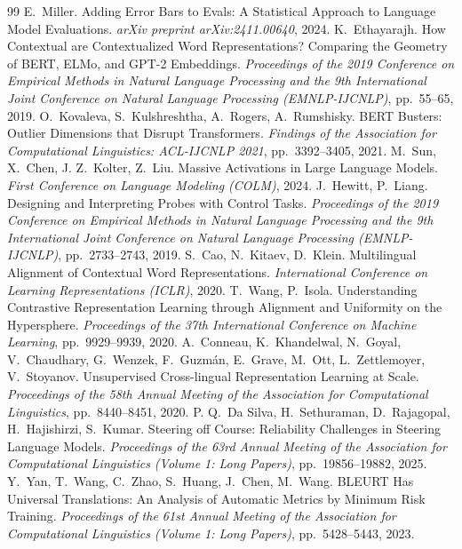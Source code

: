 \documentclass[11pt,a4paper]{article}
\begin{document}
\begin{thebibliography}{99}
E.~Miller. Adding Error Bars to Evals: A Statistical Approach to Language Model Evaluations. \emph{arXiv preprint arXiv:2411.00640}, 2024.
K.~Ethayarajh. How Contextual are Contextualized Word Representations? Comparing the Geometry of BERT, ELMo, and GPT-2 Embeddings. \emph{Proceedings of the 2019 Conference on Empirical Methods in Natural Language Processing and the 9th International Joint Conference on Natural Language Processing (EMNLP-IJCNLP)}, pp.~55--65, 2019.
O.~Kovaleva, S.~Kulshreshtha, A.~Rogers, A.~Rumshisky. BERT Busters: Outlier Dimensions that Disrupt Transformers. \emph{Findings of the Association for Computational Linguistics: ACL-IJCNLP 2021}, pp.~3392--3405, 2021.
M.~Sun, X.~Chen, J. Z.~Kolter, Z.~Liu. Massive Activations in Large Language Models. \emph{First Conference on Language Modeling (COLM)}, 2024.
J.~Hewitt, P.~Liang. Designing and Interpreting Probes with Control Tasks. \emph{Proceedings of the 2019 Conference on Empirical Methods in Natural Language Processing and the 9th International Joint Conference on Natural Language Processing (EMNLP-IJCNLP)}, pp.~2733--2743, 2019.
S.~Cao, N.~Kitaev, D.~Klein. Multilingual Alignment of Contextual Word Representations. \emph{International Conference on Learning Representations (ICLR)}, 2020.
T.~Wang, P.~Isola. Understanding Contrastive Representation Learning through Alignment and Uniformity on the Hypersphere. \emph{Proceedings of the 37th International Conference on Machine Learning}, pp.~9929--9939, 2020.
A.~Conneau, K.~Khandelwal, N.~Goyal, V.~Chaudhary, G.~Wenzek, F.~Guzm\'an, E.~Grave, M.~Ott, L.~Zettlemoyer, V.~Stoyanov. Unsupervised Cross-lingual Representation Learning at Scale. \emph{Proceedings of the 58th Annual Meeting of the Association for Computational Linguistics}, pp.~8440--8451, 2020.
P. Q.~Da Silva, H.~Sethuraman, D.~Rajagopal, H.~Hajishirzi, S.~Kumar. Steering off Course: Reliability Challenges in Steering Language Models. \emph{Proceedings of the 63rd Annual Meeting of the Association for Computational Linguistics (Volume 1: Long Papers)}, pp.~19856--19882, 2025.
Y.~Yan, T.~Wang, C.~Zhao, S.~Huang, J.~Chen, M.~Wang. BLEURT Has Universal Translations: An Analysis of Automatic Metrics by Minimum Risk Training. \emph{Proceedings of the 61st Annual Meeting of the Association for Computational Linguistics (Volume 1: Long Papers)}, pp.~5428--5443, 2023.

\end{thebibliography}
\end{document}
